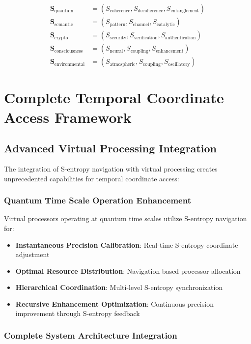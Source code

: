 \documentclass[12pt,a4paper]{article}
\begin{document}
{{{{{{{{{{{{{\begin{align}
\mathbf{S}_{\text{quantum}} &= (S_{\text{coherence}}, S_{\text{decoherence}}, S_{\text{entanglement}}) \\
\mathbf{S}_{\text{semantic}} &= (S_{\text{pattern}}, S_{\text{channel}}, S_{\text{catalytic}}) \\
\mathbf{S}_{\text{crypto}} &= (S_{\text{security}}, S_{\text{verification}}, S_{\text{authentication}}) \\
\mathbf{S}_{\text{consciousness}} &= (S_{\text{neural}}, S_{\text{coupling}}, S_{\text{enhancement}}) \\
\mathbf{S}_{\text{environmental}} &= (S_{\text{atmospheric}}, S_{\text{coupling}}, S_{\text{oscillatory}})
\end{align}

\section{Complete Temporal Coordinate Access Framework}

\subsection{Advanced Virtual Processing Integration}

The integration of S-entropy navigation with virtual processing creates unprecedented capabilities for temporal coordinate access:

\subsubsection{Quantum Time Scale Operation Enhancement}

Virtual processors operating at quantum time scales utilize S-entropy navigation for:

\begin{itemize}
\item \textbf{Instantaneous Precision Calibration}: Real-time S-entropy coordinate adjustment
\item \textbf{Optimal Resource Distribution}: Navigation-based processor allocation
\item \textbf{Hierarchical Coordination}: Multi-level S-entropy synchronization
\item \textbf{Recursive Enhancement Optimization}: Continuous precision improvement through S-entropy feedback
\end{itemize}

\subsubsection{Complete System Architecture Integration}

}}}}}}}}}}}}}
\end{document}
